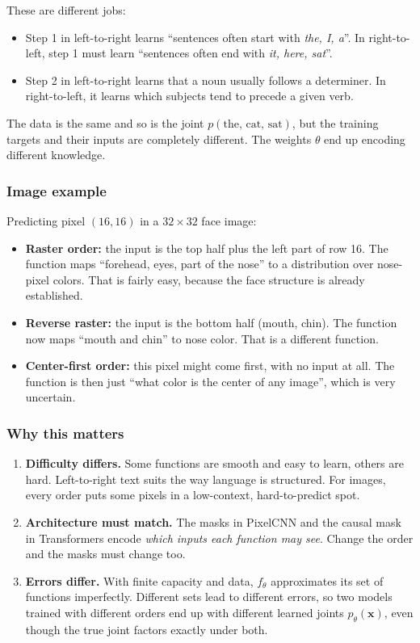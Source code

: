 These are different jobs:
\begin{itemize}
  \item Step 1 in left-to-right learns ``sentences often start with \emph{the, I, a}''. In right-to-left, step 1 must learn ``sentences often end with \emph{it, here, sat}''.
  \item Step 2 in left-to-right learns that a noun usually follows a determiner. In right-to-left, it learns which subjects tend to precede a given verb.
\end{itemize}
The data is the same and so is the joint $p(\text{the, cat, sat})$, but the training targets and their inputs are completely different. The weights $\theta$ end up encoding different knowledge.

\subsubsection*{Image example}

Predicting pixel $(16,16)$ in a $32\times32$ face image:
\begin{itemize}
  \item \textbf{Raster order:} the input is the top half plus the left part of row 16. The function maps ``forehead, eyes, part of the nose'' to a distribution over nose-pixel colors. That is fairly easy, because the face structure is already established.
  \item \textbf{Reverse raster:} the input is the bottom half (mouth, chin). The function now maps ``mouth and chin'' to nose color. That is a different function.
  \item \textbf{Center-first order:} this pixel might come first, with no input at all. The function is then just ``what color is the center of any image'', which is very uncertain.
\end{itemize}

\subsubsection*{Why this matters}

\begin{enumerate}
  \item \textbf{Difficulty differs.} Some functions are smooth and easy to learn, others are hard. Left-to-right text suits the way language is structured. For images, every order puts some pixels in a low-context, hard-to-predict spot.
  \item \textbf{Architecture must match.} The masks in PixelCNN and the causal mask in Transformers encode \emph{which inputs each function may see}. Change the order and the masks must change too.
  \item \textbf{Errors differ.} With finite capacity and data, $f_\theta$ approximates its set of functions imperfectly. Different sets lead to different errors, so two models trained with different orders end up with different learned joints $p_\theta(\mathbf{x})$, even though the true joint factors exactly under both.
\end{enumerate}

